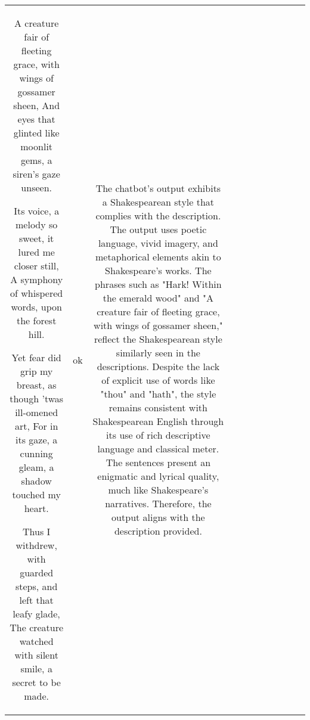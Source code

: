 \begin{table}[h!]
\begin{tabular}{|c|c|c|c|c|c|c|c|c|c|c|}
A creature fair of fleeting grace, with wings of gossamer sheen,
And eyes that glinted like moonlit gems, a siren's gaze unseen.

Its voice, a melody so sweet, it lured me closer still,
A symphony of whispered words, upon the forest hill.

Yet fear did grip my breast, as though 'twas ill-omened art,
For in its gaze, a cunning gleam, a shadow touched my heart.

Thus I withdrew, with guarded steps, and left that leafy glade,
The creature watched with silent smile, a secret to be made.


 & ok & The chatbot's output exhibits a Shakespearean style that complies with the description. The output uses poetic language, vivid imagery, and metaphorical elements akin to Shakespeare's works. The phrases such as "Hark! Within the emerald wood" and "A creature fair of fleeting grace, with wings of gossamer sheen," reflect the Shakespearean style similarly seen in the descriptions. Despite the lack of explicit use of words like "thou" and "hath", the style remains consistent with Shakespearean English through its use of rich descriptive language and classical meter. The sentences present an enigmatic and lyrical quality, much like Shakespeare's narratives. Therefore, the output aligns with the description provided.


\end{tabular}
\end{table}
